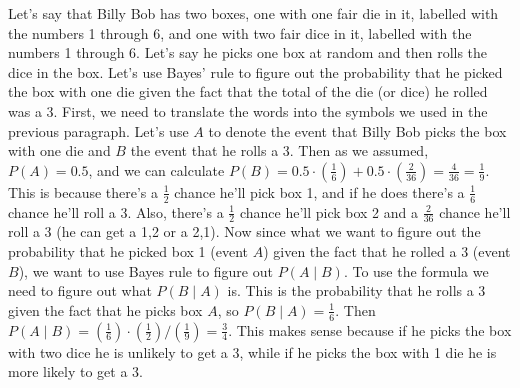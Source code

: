 Let's say that Billy Bob has two boxes, one with one fair die in it, labelled with the numbers 1 through 6, and one with two fair dice in it, labelled with the numbers 1 through 6. Let's say he picks one box at random and then rolls the dice in the box. Let's use Bayes' rule to figure out the probability that he picked the box with one die given the fact that the total of the die (or dice) he rolled was a 3. First, we need to translate the words into the symbols we used in the previous paragraph. Let's use $A$ to denote the event that Billy Bob picks the box with one die and $B$ the event that he rolls a 3. Then as we assumed, $P(A) = 0.5$, and we can calculate $P(B)=0.5\cdot \left(\frac{1}{6}\right)+0.5\cdot \left(\frac{2}{36}\right)= \frac{4}{36}=\frac{1}{9}$. This is because there's a $\frac{1}{2}$ chance he'll pick box 1, and if he does there's a $\frac{1}{6}$ chance he'll roll a 3. Also, there's a $\frac{1}{2}$ chance he'll pick box 2 and a $\frac{2}{36}$ chance he'll roll a 3 (he can get a 1,2 or a 2,1). Now since what we want to figure out the probability that he picked box 1 (event $A$) given the fact that he rolled a 3 (event $B$), we want to use Bayes rule to figure out $P(A\mid B)$. To use the formula we need to figure out what $P(B\mid A)$ is. This is the probability that he rolls a 3 given the fact that he picks box $A$, so $P(B\mid A)=\frac{1}{6}$. Then $P(A\mid B)=\left(\frac{1}{6}\right)\cdot \left(\frac{1}{2}\right)/\left(\frac{1}{9}\right)=\frac{3}{4}$. This makes sense because if he picks the box with two dice he is unlikely to get a 3, while if he picks the box with 1 die he is more likely to get a 3. \\

 \vspace{0.2cm}

